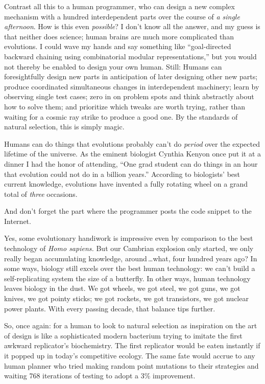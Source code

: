 {{
 Contrast all this to a human programmer, who can design a new
complex mechanism with a hundred interdependent parts over the course
of \textit{a single afternoon}. How is this even \textit{possible}? I
don't know all the answer, and my guess is that neither
does science; human brains are much more complicated than evolutions. I
could wave my hands and say something like
``goal-directed backward chaining using combinatorial
modular representations,'' but you would not thereby
be enabled to design your own human. Still: Humans can foresightfully
design new parts in anticipation of later designing other new parts;
produce coordinated simultaneous changes in interdependent machinery;
learn by observing single test cases; zero in on problem spots and
think abstractly about how to solve them; and prioritize which tweaks
are worth trying, rather than waiting for a cosmic ray strike to
produce a good one. By the standards of natural selection, this is
simply magic.}

{
 Humans can do things that evolutions probably
can't do \textit{period} over the expected lifetime of
the universe. As the eminent biologist Cynthia Kenyon once put it at a
dinner I had the honor of attending, ``One grad
student can do things in an hour that evolution could not do in a
billion years.'' According to
biologists' best current knowledge, evolutions have
invented a fully rotating wheel on a grand total of \textit{three}
occasions.}

{
 And don't forget the part where the programmer
posts the code snippet to the Internet.}

{
 Yes, some evolutionary handiwork is impressive even by comparison
to the best technology of \textit{Homo sapiens.} But our Cambrian
explosion only started, we only really began accumulating knowledge,
around\,\ldots what, four hundred years ago? In some ways, biology still
excels over the best human technology: we can't build a
self-replicating system the size of a butterfly. In other ways, human
technology leaves biology in the dust. We got wheels, we got steel, we
got guns, we got knives, we got pointy sticks; we got rockets, we got
transistors, we got nuclear power plants. With every passing decade,
that balance tips further.}

{
 So, once again: for a human to look to natural selection as
inspiration on the art of design is like a sophisticated modern
bacterium trying to imitate the first awkward
replicator's biochemistry. The first replicator would
be eaten instantly if it popped up in today's
competitive ecology. The same fate would accrue to any human planner
who tried making random point mutations to their strategies and waiting
768 iterations of testing to adopt a 3\% improvement.}

}

